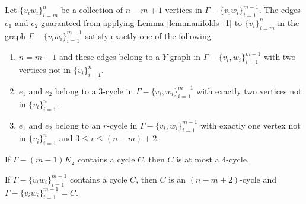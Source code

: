\begin{lem}
    \label{lem:manifolds_2}
Let \(\{v_i w_i\}_{i=m}^{n}\) be a collection of \(n-m+1\) vertices in 
\(\Gamma - \{v_i w_i\}_{i=1}^{m-1}\).
The edges \(e_1\) and \(e_2\) guaranteed from applying Lemma \ref{lem:manifolds_1} 
to \(\{v_i\}_{i=m}^{n}\) in the graph \(\Gamma - \{v_i w_i\}_{i=1}^{m-1}\) satisfy exactly one of the following:
\begin{enumerate}[label=(\roman*)]
        \item \(n = m+1\) and these edges belong to a \(Y\)-graph in \(\Gamma - \{v_i, w_i\}_{i=1}^{m-1}\) with two vertices not in \(\{v_i\}_{i=1}^n\).
        \item \(e_1\) and \(e_2\) belong to a \(3\)-cycle in \(\Gamma - \{v_i, w_i\}_{i=1}^{m-1}\) with exactly two vertices not in \(\{v_i\}_{i=1}^n\).
        \item \(e_1\) and \(e_2\) belong to an \(r\)-cycle in \(\Gamma - \{v_i, w_i\}_{i=1}^{m-1}\) with exactly one vertex not in \(\{v_i\}_{i=1}^n\) and \(3 \le r \le (n-m)+2\).
\end{enumerate}

\end{lem}


\begin{lem}
If \(\Gamma - (m-1)K_2\) contains a cycle \(C\), then \(C\) is at most a \(4\)-cycle.
\end{lem}

\begin{lem}
\label{lem:manifolds_C}
If \(\Gamma - \{v_i w_i\}_{i=1}^{m-1}\) contains a cycle \(C\),
then \(C\) is an \((n-m+2)\)-cycle and \(\Gamma - \{v_i w_i\}_{i=1}^{m-1} = C\).
\end{lem}

